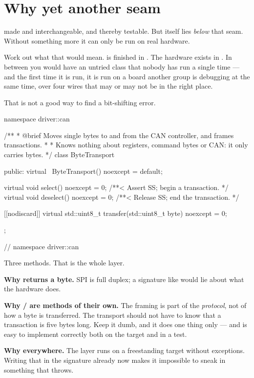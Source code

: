 \section{Why yet another seam}
\label{sec:whyseam}

 made  and  interchangeable, and thereby 
testable. But  itself lies \emph{below} that seam. Without something more it can only be
run on real hardware.

Work out what that would mean.  is finished in . The hardware exists
in . In between you would have an untried class that nobody has run a single
time --- and the first time it is run, it is run on a board another group is debugging at the same
time, over four wires that may or may not be in the right place.

That is not a good way to find a bit-shifting error.

\begin{cppcode}
namespace driver::can
{
/**
 * @brief Moves single bytes to and from the CAN controller, and frames transactions.
 *
 *        Knows nothing about registers, command bytes or CAN: it only carries bytes.
 */
class ByteTransport
{
public:
    virtual ~ByteTransport() noexcept = default;

    virtual void select() noexcept   = 0;   /**< Assert SS; begin a transaction. */
    virtual void deselect() noexcept = 0;   /**< Release SS; end the transaction. */

    [[nodiscard]] virtual std::uint8_t transfer(std::uint8_t byte) noexcept = 0;
};
} // namespace driver::can
\end{cppcode}

Three methods. That is the whole layer.

\textbf{Why  returns a byte.} SPI is full duplex; a signature like
 would lie about what the hardware does.

\textbf{Why / are methods of their own.} The  framing is
part of the \emph{protocol}, not of how a byte is transferred. The transport should not have to
know that a transaction is five bytes long. Keep it dumb, and it does one thing only --- and is
easy to implement correctly both on the target and in a test.

\textbf{Why  everywhere.} The layer runs on a freestanding target without
exceptions. Writing that in the signature already now makes it impossible to sneak in something
that throws.

